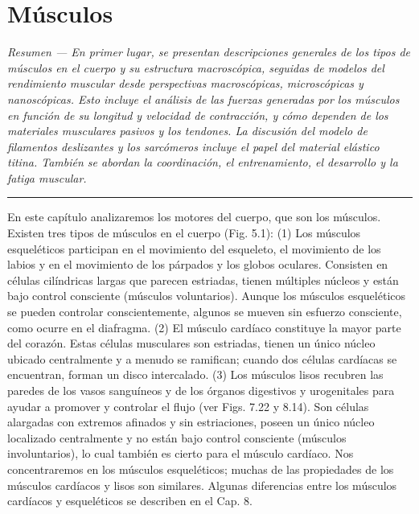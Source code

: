 \documentclass[12pt]{book}
\begin{document}
\setcounter{chapter}{4}

\chapter{Músculos}

\begin{flushleft}
    \textit{Resumen --- En primer lugar, se presentan descripciones generales de los tipos de músculos en el cuerpo y su estructura macroscópica, seguidas de modelos del rendimiento muscular desde perspectivas macroscópicas, microscópicas y nanoscópicas. Esto incluye el análisis de las fuerzas generadas por los músculos en función de su longitud y velocidad de contracción, y cómo dependen de los materiales musculares pasivos y los tendones. La discusión del modelo de filamentos deslizantes y los sarcómeros incluye el papel del material elástico titina. También se abordan la coordinación, el entrenamiento, el desarrollo y la fatiga muscular.}
\end{flushleft}

\hrule
\vspace{1em}

En este capítulo analizaremos los motores del cuerpo, que son los músculos. Existen tres tipos de músculos en el cuerpo (Fig. 5.1): (1) Los músculos esqueléticos participan en el movimiento del esqueleto, el movimiento de los labios y en el movimiento de los párpados y los globos oculares. Consisten en células cilíndricas largas que parecen estriadas, tienen múltiples núcleos y están bajo control consciente (músculos voluntarios). Aunque los músculos esqueléticos se pueden controlar conscientemente, algunos se mueven sin esfuerzo consciente, como ocurre en el diafragma. (2) El músculo cardíaco constituye la mayor parte del corazón. Estas células musculares son estriadas, tienen un único núcleo ubicado centralmente y a menudo se ramifican; cuando dos células cardíacas se encuentran, forman un disco intercalado. (3) Los músculos lisos recubren las paredes de los vasos sanguíneos y de los órganos digestivos y urogenitales para ayudar a promover y controlar el flujo (ver Figs. 7.22 y 8.14). Son células alargadas con extremos afinados y sin estriaciones, poseen un único núcleo localizado centralmente y no están bajo control consciente (músculos involuntarios), lo cual también es cierto para el músculo cardíaco. Nos concentraremos en los músculos esqueléticos; muchas de las propiedades de los músculos cardíacos y lisos son similares. Algunas diferencias entre los músculos cardíacos y esqueléticos se describen en el Cap. 8.
\end{document}
